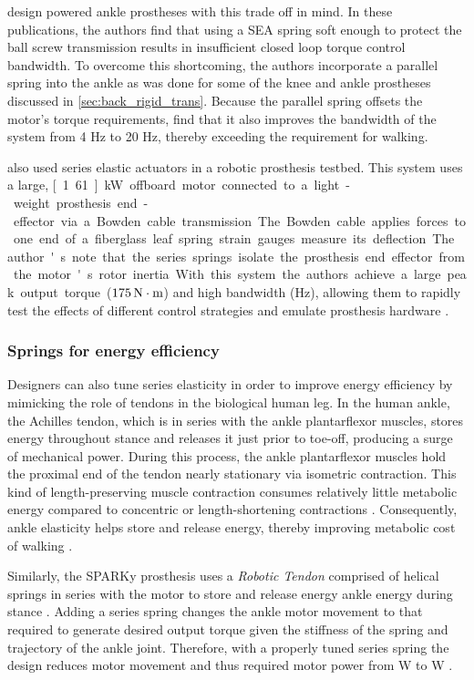 \citet{au2007biomechanical, au2008powered} design powered ankle prostheses with
this trade off in mind. In these publications, the authors find that using a
SEA spring soft enough to protect the ball screw transmission results in
insufficient closed loop torque control bandwidth. To overcome this shortcoming,
the authors incorporate a parallel spring into the ankle as was done for some of
the knee and ankle prostheses discussed in \cref{sec:back_rigid_trans}. Because
the parallel spring offsets the motor's torque requirements,
\citeauthor{au2008powered} find that it also improves the bandwidth of the
system from 4 Hz to 20 Hz, thereby exceeding the requirement for walking. 

\citet{caputo2013experimental} also used series elastic actuators in a robotic
prosthesis testbed. This system uses a large, \unit[1.61]{kW} offboard motor
connected to a light-weight prosthesis end-effector via a Bowden cable
transmission. The Bowden cable applies forces to one end of a fiberglass leaf
spring strain gauges measure its deflection. The author's note that the series 
springs isolate the prosthesis end effector from the motor's rotor inertia. With
this system the authors achieve a large peak output torque ($\unit[175]{N \cdot
m}$) and high bandwidth (\unit[17]{Hz}), allowing them to rapidly test the
effects of different control strategies and emulate prosthesis hardware
\citep{caputo2015informing}.

\subsubsection{Springs for energy efficiency}
Designers can also tune series elasticity in order to improve energy efficiency
by mimicking the role of tendons in the biological human leg. In the human
ankle, the Achilles tendon, which is in series with the ankle plantarflexor
muscles, stores energy throughout stance and releases it just prior to toe-off,
producing a surge of mechanical power. During this process, the ankle
plantarflexor muscles hold the proximal end of the tendon nearly stationary via
isometric contraction. This kind of length-preserving muscle contraction
consumes relatively little metabolic energy compared to concentric or
length-shortening contractions \citep{rall1984energetic}. Consequently, ankle
elasticity helps store and release energy, thereby improving metabolic cost of
walking \citep{sawicki2009pays}.

Similarly, the SPARKy prosthesis uses a \emph{Robotic Tendon} comprised of
helical springs in series with the motor to store and release energy ankle
energy during stance \citep{hitt2007sparky, bellman2008sparky,
holgate2008sparky}. Adding a series spring changes the ankle motor movement to
that required to generate desired output torque given the stiffness of the
spring and trajectory of the ankle joint. Therefore, with a properly tuned series spring the
design reduces motor movement and thus required motor power from \unit[250]{W}
to \unit[77]{W} \citep{hitt2007sparky}.


